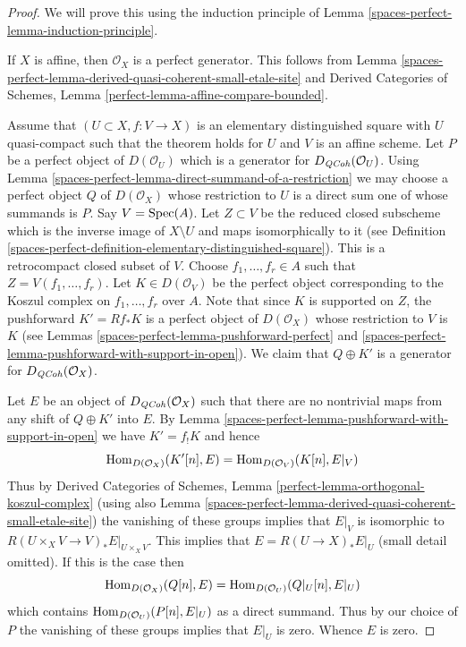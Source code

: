 \begin{proof}
We will prove this using the induction principle of
Lemma \ref{spaces-perfect-lemma-induction-principle}.

\medskip\noindent
If $X$ is affine, then $\mathcal{O}_X$ is a perfect generator.
This follows from Lemma \ref{spaces-perfect-lemma-derived-quasi-coherent-small-etale-site}
and
Derived Categories of Schemes,
Lemma \ref{perfect-lemma-affine-compare-bounded}.

\medskip\noindent
Assume that $(U \subset X, f : V \to X)$ is an elementary distinguished
square with $U$ quasi-compact such that the theorem holds for $U$ and $V$
is an affine scheme.
Let $P$ be a perfect object of $D(\mathcal{O}_U)$ which is a generator
for $D_{\mathit{QCoh}}(\mathcal{O}_U)$. Using
Lemma \ref{spaces-perfect-lemma-direct-summand-of-a-restriction} we may
choose a perfect object
$Q$ of $D(\mathcal{O}_X)$ whose restriction to $U$ is a direct sum one
of whose summands is $P$. Say $V = \operatorname{Spec}(A)$. Let $Z \subset V$
be the reduced closed subscheme which is the inverse image of
$X \setminus U$ and maps isomorphically to it
(see Definition \ref{spaces-perfect-definition-elementary-distinguished-square}).
This is a retrocompact closed subset of $V$.
Choose $f_1, \ldots, f_r \in A$ such that
$Z = V(f_1, \ldots, f_r)$. Let $K \in D(\mathcal{O}_V)$ be the perfect
object corresponding to the Koszul complex on $f_1, \ldots, f_r$ over $A$.
Note that since $K$ is supported on $Z$, the pushforward
$K' = Rf_*K$ is a perfect object of $D(\mathcal{O}_X)$ whose
restriction to $V$ is $K$ (see Lemmas \ref{spaces-perfect-lemma-pushforward-perfect}
and \ref{spaces-perfect-lemma-pushforward-with-support-in-open}).
We claim that $Q \oplus K'$ is a generator for
$D_{\mathit{QCoh}}(\mathcal{O}_X)$.

\medskip\noindent
Let $E$ be an object of $D_{\mathit{QCoh}}(\mathcal{O}_X)$ such that
there are no nontrivial maps from any shift of $Q \oplus K'$ into $E$.
By Lemma \ref{spaces-perfect-lemma-pushforward-with-support-in-open}
we have $K' =  f_! K$ and hence
$$
\operatorname{Hom}_{D(\mathcal{O}_X)}(K'[n], E) = \operatorname{Hom}_{D(\mathcal{O}_V)}(K[n], E|_V)
$$
Thus by
Derived Categories of Schemes,
Lemma \ref{perfect-lemma-orthogonal-koszul-complex}
(using also
Lemma \ref{spaces-perfect-lemma-derived-quasi-coherent-small-etale-site})
the vanishing of these groups implies that $E|_V$ is isomorphic to
$R(U \times_X V \to V)_*E|_{U \times_X V}$. This implies that
$E = R(U \to X)_*E|_U$ (small detail omitted). If this is the case then
$$
\operatorname{Hom}_{D(\mathcal{O}_X)}(Q[n], E) = \operatorname{Hom}_{D(\mathcal{O}_U)}(Q|_U[n], E|_U)
$$
which contains $\operatorname{Hom}_{D(\mathcal{O}_U)}(P[n], E|_U)$ as a direct summand.
Thus by our choice of $P$ the vanishing of these groups implies that $E|_U$
is zero. Whence $E$ is zero.
\end{proof}

